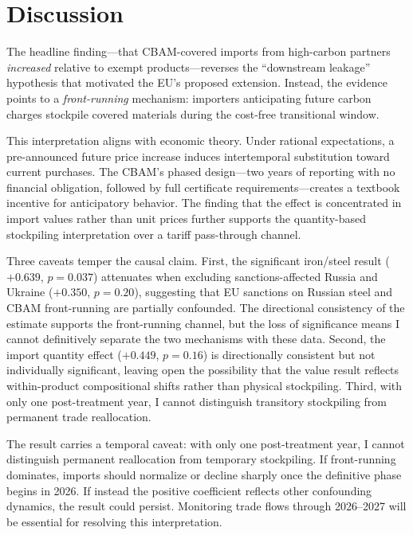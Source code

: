 \documentclass[12pt]{article}
\begin{document}



\section{Discussion}
\label{sec:discussion}

The headline finding---that CBAM-covered imports from high-carbon partners \emph{increased} relative to exempt products---reverses the ``downstream leakage'' hypothesis that motivated the EU's proposed extension. Instead, the evidence points to a \emph{front-running} mechanism: importers anticipating future carbon charges stockpile covered materials during the cost-free transitional window.

This interpretation aligns with economic theory. Under rational expectations, a pre-announced future price increase induces intertemporal substitution toward current purchases. The CBAM's phased design---two years of reporting with no financial obligation, followed by full certificate requirements---creates a textbook incentive for anticipatory behavior. The finding that the effect is concentrated in import values rather than unit prices further supports the quantity-based stockpiling interpretation over a tariff pass-through channel.

Three caveats temper the causal claim. First, the significant iron/steel result ($+0.639$, $p = 0.037$) attenuates when excluding sanctions-affected Russia and Ukraine ($+0.350$, $p = 0.20$), suggesting that EU sanctions on Russian steel and CBAM front-running are partially confounded. The directional consistency of the estimate supports the front-running channel, but the loss of significance means I cannot definitively separate the two mechanisms with these data. Second, the import quantity effect ($+0.449$, $p = 0.16$) is directionally consistent but not individually significant, leaving open the possibility that the value result reflects within-product compositional shifts rather than physical stockpiling. Third, with only one post-treatment year, I cannot distinguish transitory stockpiling from permanent trade reallocation.

The result carries a temporal caveat: with only one post-treatment year, I cannot distinguish permanent reallocation from temporary stockpiling. If front-running dominates, imports should normalize or decline sharply once the definitive phase begins in 2026. If instead the positive coefficient reflects other confounding dynamics, the result could persist. Monitoring trade flows through 2026--2027 will be essential for resolving this interpretation.
\end{document}
